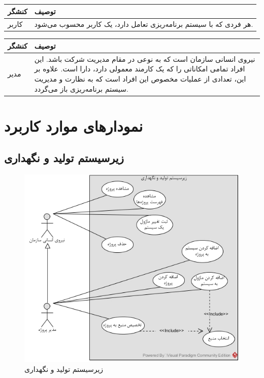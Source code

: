 \begin{table}[H]
	\centering
	\begin{tabular}{|p{3cm}|p{8cm}|}
		\hline
		
		
		کنشگر	& توصیف  \\
		\hline
		کاربر &
		
		هر فردی که با سیستم  برنامه‌ریزی تعامل دارد، یک کاربر محسوب می‌شود.
		\\
		\hline
		
	\end{tabular}
\end{table}


\begin{table}[H]
	\centering
	\begin{tabular}{|p{3cm}|p{8cm}|}
		\hline
		
		
		کنشگر	& توصیف  \\
		\hline
		مدیر &
		
		نیروی انسانی سازمان است که به نوعی در مقام مدیریت شرکت باشد. این افراد تمامی امکاناتی را که یک کارمند معمولی  دارد، دارا است. علاوه بر این، تعدادی از عملیات مخصوص این افراد است که به نظارت و مدیریت سیستم برنامه‌ریزی باز می‌گردد.
		\\
		\hline
		
	\end{tabular}
\end{table}

\newpage
\section{نمودارهای موارد کاربرد}

\subsection{زیرسیستم تولید و نگهداری}
\begin{figure}[H]
	\centering
	\includegraphics[scale=0.8]{img/usecase/tolid}
	\caption{زیرسیستم تولید و نگهداری}
\end{figure}

